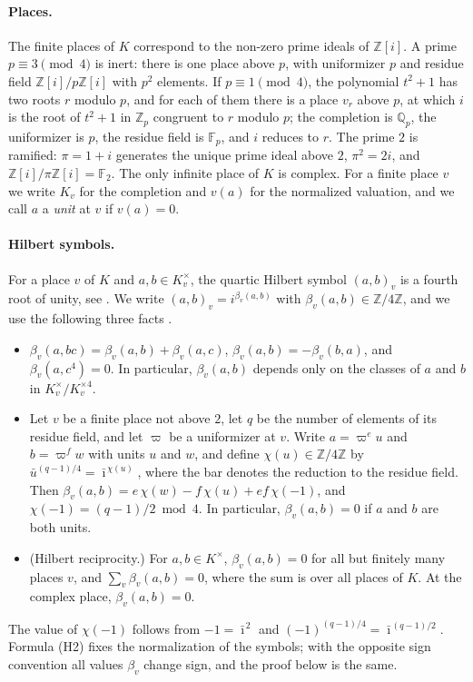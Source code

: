 \documentclass[11pt]{article}
\newcommand{\Z}{\mathbb{Z}}
\newcommand{\Q}{\mathbb{Q}}
\newcommand{\F}{\mathbb{F}}
\begin{document}
\paragraph{Places.} The finite places of $K$ correspond to the non-zero prime ideals of $\Z[i]$. A prime $p\equiv3\pmod4$ is inert: there is one place above $p$, with uniformizer $p$ and residue field $\Z[i]/p\Z[i]$ with $p^2$ elements. If $p\equiv1\pmod4$, the polynomial $t^2+1$ has two roots $r$ modulo $p$, and for each of them there is a place $v_r$ above $p$, at which $i$ is the root of $t^2+1$ in $\Z_p$ congruent to $r$ modulo $p$; the completion is $\Q_p$, the uniformizer is $p$, the residue field is $\F_p$, and $i$ reduces to $r$. The prime $2$ is ramified: $\pi=1+i$ generates the unique prime ideal above $2$, $\pi^2=2i$, and $\Z[i]/\pi\Z[i]=\F_2$. The only infinite place of $K$ is complex. For a finite place $v$ we write $K_v$ for the completion and $v(a)$ for the normalized valuation, and we call $a$ a \emph{unit} at $v$ if $v(a)=0$.

\paragraph{Hilbert symbols.} For a place $v$ of $K$ and $a,b\in K_v^\times$, the quartic Hilbert symbol $(a,b)_v$ is a fourth root of unity, see \cite[Chapter~V, \S3]{N}. We write $(a,b)_v=i^{\beta_v(a,b)}$ with $\beta_v(a,b)\in\Z/4\Z$, and we use the following three facts \cite[Chapter~V, \S3 and Chapter~VI, \S8]{N}.
\begin{itemize}
\item[(H1)] $\beta_v(a,bc)=\beta_v(a,b)+\beta_v(a,c)$, $\beta_v(a,b)=-\beta_v(b,a)$, and $\beta_v(a,c^4)=0$. In particular, $\beta_v(a,b)$ depends only on the classes of $a$ and $b$ in $K_v^\times/K_v^{\times4}$.
\item[(H2)] Let $v$ be a finite place not above $2$, let $q$ be the number of elements of its residue field, and let $\varpi$ be a uniformizer at $v$. Write $a=\varpi^eu$ and $b=\varpi^fw$ with units $u$ and $w$, and define $\chi(u)\in\Z/4\Z$ by $\bar u^{(q-1)/4}=\bar\imath^{\,\chi(u)}$, where the bar denotes the reduction to the residue field. Then $\beta_v(a,b)=e\,\chi(w)-f\,\chi(u)+ef\,\chi(-1)$, and $\chi(-1)=(q-1)/2\bmod4$. In particular, $\beta_v(a,b)=0$ if $a$ and $b$ are both units.
\item[(H3)] (Hilbert reciprocity.) For $a,b\in K^\times$, $\beta_v(a,b)=0$ for all but finitely many places $v$, and $\sum_v\beta_v(a,b)=0$, where the sum is over all places of $K$. At the complex place, $\beta_v(a,b)=0$.
\end{itemize}
The value of $\chi(-1)$ follows from $-1=\bar\imath^{\,2}$ and $(-1)^{(q-1)/4}=\bar\imath^{\,(q-1)/2}$. Formula (H2) fixes the normalization of the symbols; with the opposite sign convention all values $\beta_v$ change sign, and the proof below is the same.
\end{document}
